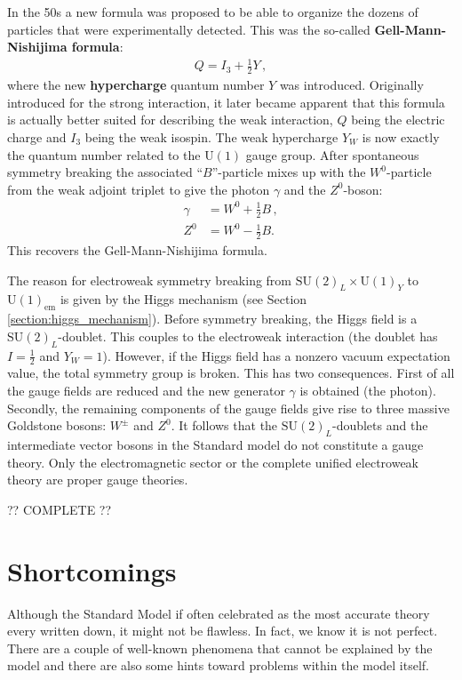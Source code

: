    In the 50s a new formula was proposed to be able to organize the dozens of particles that were experimentally detected. This was the so-called \textbf{Gell-Mann-Nishijima formula}:
    \begin{gather}
        Q = I_3 + \tfrac{1}{2}Y\,,
    \end{gather}
    where the new \textbf{hypercharge} quantum number $Y$ was introduced. Originally introduced for the strong interaction, it later became apparent that this formula is actually better suited for describing the weak interaction, $Q$ being the electric charge and $I_3$ being the weak isospin. The weak hypercharge $Y_W$ is now exactly the quantum number related to the $\mathrm{U}(1)$ gauge group. After spontaneous symmetry breaking the associated ``$B$''-particle mixes up with the $W^0$-particle from the weak adjoint triplet to give the photon $\gamma$ and the $Z^0$-boson:
    \begin{align}
        \gamma &= W^0 + \tfrac{1}{2}B\,,\\
        Z^0 &= W^0 - \tfrac{1}{2}B.
    \end{align}
    This recovers the Gell-Mann-Nishijima formula.

    The reason for electroweak symmetry breaking from $\mathrm{SU}(2)_L\times\mathrm{U}(1)_Y$ to $\mathrm{U}(1)_\text{em}$ is given by the Higgs mechanism (see Section \ref{section:higgs_mechanism}). Before symmetry breaking, the Higgs field is a $\mathrm{SU}(2)_L$-doublet. This couples to the electroweak interaction (the doublet has $I=\tfrac{1}{2}$ and $Y_W=1$). However, if the Higgs field has a nonzero vacuum expectation value, the total symmetry group is broken. This has two consequences. First of all the gauge fields are reduced and the new generator $\gamma$ is obtained (the photon). Secondly, the remaining components of the gauge fields give rise to three massive Goldstone bosons: $W^\pm$ and $Z^0$. It follows that the $\mathrm{SU}(2)_L$-doublets and the intermediate vector bosons in the Standard model do not constitute a gauge theory. Only the electromagnetic sector or the complete unified electroweak theory are proper gauge theories.

    ?? COMPLETE ??

\section{Shortcomings}

    Although the Standard Model if often celebrated as the most accurate theory every written down, it might not be flawless. In fact, we know it is not perfect. There are a couple of well-known phenomena that cannot be explained by the model and there are also some hints toward problems within the model itself.

